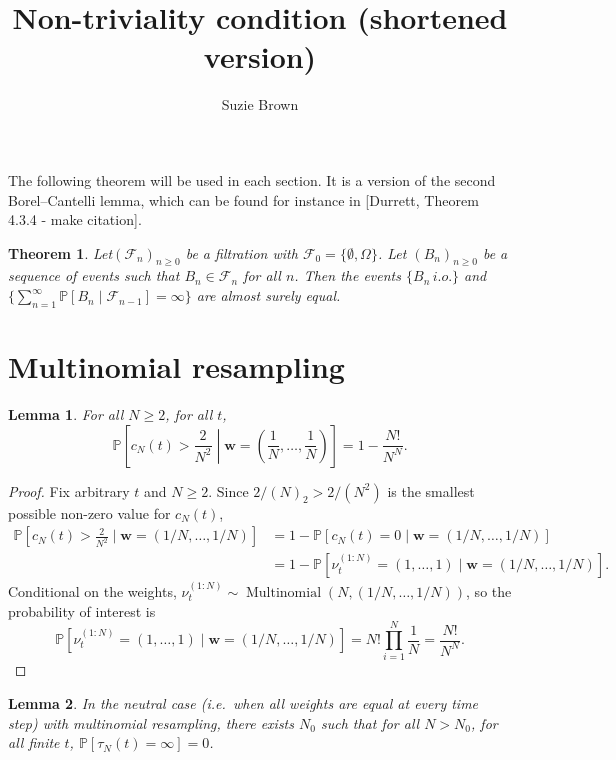 \documentclass{article}
\title{Non-triviality condition (shortened version)}
\author{Suzie Brown}
\newtheorem{thm}{Theorem}
\newtheorem{lemma}{Lemma}
\newcommand{\PR}{\mathbb{P}}
\newcommand{\Mn}{\operatorname{Multinomial}}
\begin{document}
\maketitle
\thispagestyle{fancy}

The following theorem will be used in each section. It is a version of the second Borel--Cantelli lemma, which can be found for instance in [Durrett, Theorem 4.3.4 - make citation].
\begin{thm}
Let$ (\mathcal{F}_n)_{n\geq 0}$ be a filtration with $\mathcal{F}_0 = \{\emptyset, \Omega\}$. Let $(B_n)_{n\geq 0}$ be a sequence of events such that $B_n \in \mathcal{F}_n$ for all $n$.
Then the events $\{ B_n \, i.o. \}$ and $\{ \sum_{n=1}^\infty \PR[B_n \mid \mathcal{F}_{n-1} ] =\infty \}$ are almost surely equal.
\end{thm}


\section*{Multinomial resampling}

\begin{lemma}\label{lem:neutral_cN_LB}
For all $N\geq 2$, for all $t$,
\begin{equation*}
\PR \left[c_N(t) > \frac{2}{N^2} \middle| \mathbf{w}=\left( \frac{1}{N}, \dots, \frac{1}{N} \right) \right] 
= 1- \frac{N!}{N^N}.
\end{equation*}
\end{lemma}

\begin{proof}
Fix arbitrary $t$ and $N\geq 2$. Since $2/(N)_2 > 2/(N^2)$ is the smallest possible non-zero value for $c_N(t)$,
\begin{align*}
\PR \left[c_N(t) > \frac{2}{N^2} \mid \mathbf{w}=(1/N, \dots, 1/N) \right]
&= 1- \PR[c_N(t) = 0  \mid \mathbf{w}=(1/N, \dots, 1/N)] \\
&= 1- \PR[\nu_t^{(1:N)} = (1,\dots, 1) \mid \mathbf{w}=(1/N, \dots, 1/N)].
\end{align*}
Conditional on the weights, $\nu_t^{(1:N)} \sim \Mn(N, (1/N, \dots, 1/N))$, so the probability of interest is
\begin{equation*}
\PR[\nu_t^{(1:N)} = (1,\dots, 1) \mid \mathbf{w}=(1/N, \dots, 1/N)] =
N! \prod_{i=1}^N \frac{1}{N}
= \frac{N!}{N^N}.
\end{equation*}
\end{proof}


\begin{lemma}\label{thm:nontrivial_mn_optimalw}
In the neutral case (i.e.\ when all weights are equal at every time step) with multinomial resampling, there exists $N_0$ such that for all $N>N_0$, for all finite $t$, $\PR[\tau_N(t) = \infty] =0$.
\end{lemma}
\end{document}
